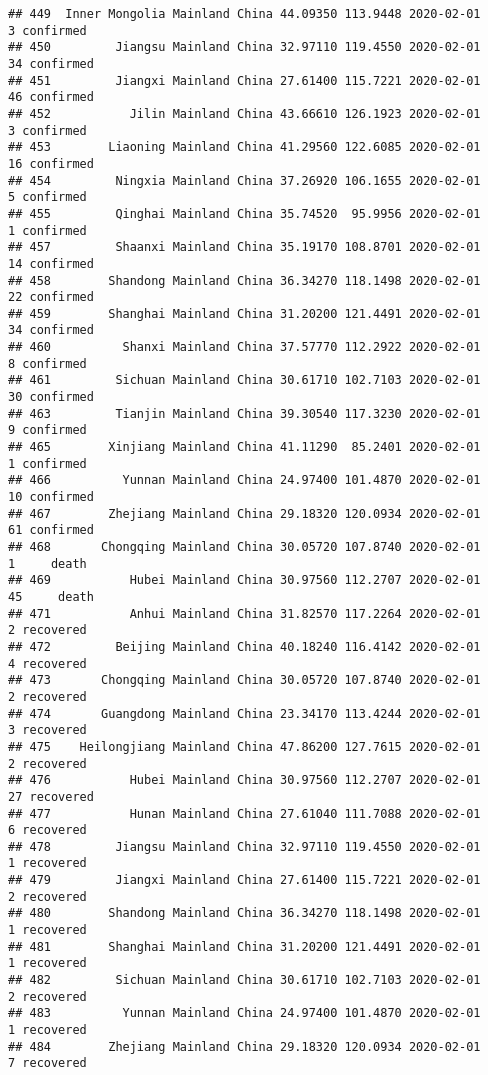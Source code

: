 \documentclass[
]{article}
\begin{document}
\begin{verbatim}
## 449  Inner Mongolia Mainland China 44.09350 113.9448 2020-02-01     3 confirmed
## 450         Jiangsu Mainland China 32.97110 119.4550 2020-02-01    34 confirmed
## 451         Jiangxi Mainland China 27.61400 115.7221 2020-02-01    46 confirmed
## 452           Jilin Mainland China 43.66610 126.1923 2020-02-01     3 confirmed
## 453        Liaoning Mainland China 41.29560 122.6085 2020-02-01    16 confirmed
## 454         Ningxia Mainland China 37.26920 106.1655 2020-02-01     5 confirmed
## 455         Qinghai Mainland China 35.74520  95.9956 2020-02-01     1 confirmed
## 457         Shaanxi Mainland China 35.19170 108.8701 2020-02-01    14 confirmed
## 458        Shandong Mainland China 36.34270 118.1498 2020-02-01    22 confirmed
## 459        Shanghai Mainland China 31.20200 121.4491 2020-02-01    34 confirmed
## 460          Shanxi Mainland China 37.57770 112.2922 2020-02-01     8 confirmed
## 461         Sichuan Mainland China 30.61710 102.7103 2020-02-01    30 confirmed
## 463         Tianjin Mainland China 39.30540 117.3230 2020-02-01     9 confirmed
## 465        Xinjiang Mainland China 41.11290  85.2401 2020-02-01     1 confirmed
## 466          Yunnan Mainland China 24.97400 101.4870 2020-02-01    10 confirmed
## 467        Zhejiang Mainland China 29.18320 120.0934 2020-02-01    61 confirmed
## 468       Chongqing Mainland China 30.05720 107.8740 2020-02-01     1     death
## 469           Hubei Mainland China 30.97560 112.2707 2020-02-01    45     death
## 471           Anhui Mainland China 31.82570 117.2264 2020-02-01     2 recovered
## 472         Beijing Mainland China 40.18240 116.4142 2020-02-01     4 recovered
## 473       Chongqing Mainland China 30.05720 107.8740 2020-02-01     2 recovered
## 474       Guangdong Mainland China 23.34170 113.4244 2020-02-01     3 recovered
## 475    Heilongjiang Mainland China 47.86200 127.7615 2020-02-01     2 recovered
## 476           Hubei Mainland China 30.97560 112.2707 2020-02-01    27 recovered
## 477           Hunan Mainland China 27.61040 111.7088 2020-02-01     6 recovered
## 478         Jiangsu Mainland China 32.97110 119.4550 2020-02-01     1 recovered
## 479         Jiangxi Mainland China 27.61400 115.7221 2020-02-01     2 recovered
## 480        Shandong Mainland China 36.34270 118.1498 2020-02-01     1 recovered
## 481        Shanghai Mainland China 31.20200 121.4491 2020-02-01     1 recovered
## 482         Sichuan Mainland China 30.61710 102.7103 2020-02-01     2 recovered
## 483          Yunnan Mainland China 24.97400 101.4870 2020-02-01     1 recovered
## 484        Zhejiang Mainland China 29.18320 120.0934 2020-02-01     7 recovered

\end{verbatim}
\end{document}
